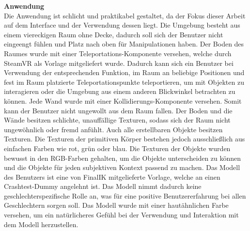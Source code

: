 \noindent \textbf{Anwendung}\\
Die Anwendung ist schlicht und praktikabel gestaltet, da der Fokus dieser Arbeit auf dem Interface und der Verwendung dessen liegt. Die Umgebung besteht aus einem viereckigen Raum ohne Decke, dadurch soll sich der Benutzer nicht eingeengt fühlen und Platz nach oben für Manipulationen haben. Der Boden des Raumes wurde mit einer Teleportations-Komponente versehen, welche durch SteamVR als Vorlage mitgeliefert wurde. Dadurch kann sich ein Benutzer bei Verwendung der entsprechenden Funktion, im Raum an beliebige Positionen und fest im Raum platzierte Teleportationspunkte teleportieren, um mit Objekten zu interagieren oder die Umgebung aus einem anderen Blickwinkel betrachten zu können. Jede Wand wurde mit einer Kollidierungs-Komponente versehen. Somit kann der Benutzer nicht ungewollt aus dem Raum fallen. Der Boden und die Wände besitzen schlichte, unauffällige Texturen, sodass sich der Raum nicht ungewöhnlich oder fremd anfühlt. Auch alle erstellbaren Objekte besitzen Texturen. Die Texturen der primitiven Körper bestehen jedoch ausschließlich aus einfachen Farben wie rot, grün oder blau. Die Texturen der Objekte wurden bewusst in den RGB-Farben gehalten, um die Objekte unterscheiden zu können und die Objekte für jeden subjektiven Kontext passend zu machen. Das Modell des Benutzers ist eine von FinalIK mitgelieferte Vorlage, welche an einen Crashtest-Dummy angelehnt ist. Das Modell nimmt dadurch keine geschlechterspezifische Rolle an, was für eine positive Benutzererfahrung bei allen Geschlechtern sorgen soll. Das Modell wurde mit einer hautähnlichen Farbe versehen, um ein natürlicheres Gefühl bei der Verwendung und Interaktion mit dem Modell herzustellen.\\

